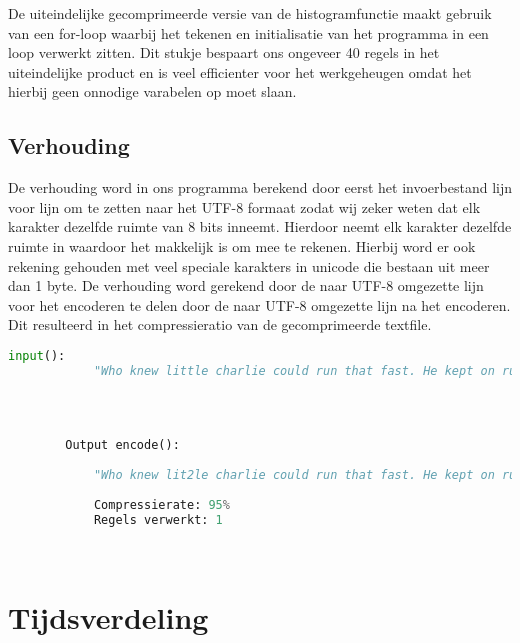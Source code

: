 \documentclass{article}
\begin{document}
      De uiteindelijke gecomprimeerde versie van de histogramfunctie maakt gebruik van een for-loop waarbij het tekenen en initialisatie van het programma in een loop verwerkt zitten. Dit stukje bespaart ons ongeveer 40 regels in het uiteindelijke product en is veel efficienter voor het werkgeheugen omdat het hierbij geen onnodige varabelen op moet slaan. 
    

    
    \subsection{Verhouding}
        De verhouding word in ons programma berekend door eerst het invoerbestand lijn voor lijn om te zetten naar het UTF-8 formaat zodat wij zeker weten dat elk karakter dezelfde ruimte van 8 bits inneemt. Hierdoor neemt elk karakter dezelfde ruimte in waardoor het makkelijk is om mee te rekenen. Hierbij word er ook rekening gehouden met veel speciale karakters in unicode die bestaan uit meer dan 1 byte. De verhouding word gerekend door de  naar UTF-8 omgezette lijn voor het encoderen te delen door de naar UTF-8 omgezette lijn na het encoderen. Dit resulteerd in het compressieratio van de gecomprimeerde textfile. 
        \newpage
        \begin{lstlisting}[frame=single, language=python]  % Start your code-block
        input():
            "Who knew little charlie could run that fast. He kept on running faster fasteer and fasteeeeeerr !"
            
            
        
        
        Output encode():    
            
            "Who knew lit2le charlie could run that fast. He kept on run2ing faster faste2r and faste6r2 !"
                
            Compressierate: 95%
            Regels verwerkt: 1

            
        \end{lstlisting}

\section{Tijdsverdeling}
\end{document}

